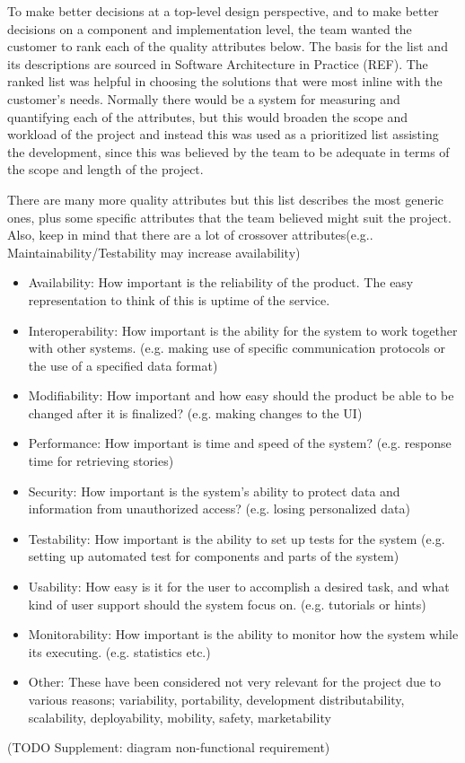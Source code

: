 To make better decisions at a top-level design perspective, and to make better decisions on a component and implementation level, the team wanted the customer to rank each of the quality attributes below. The basis for the list and its descriptions are sourced in Software Architecture in Practice (REF). The ranked list was helpful in choosing the solutions that were most inline with the customer’s needs. Normally there would be a system for measuring and quantifying each of the attributes, but this would broaden the scope and workload of the project and instead this was used as a prioritized list assisting the development, since this was believed by the team to be adequate in terms of the scope and length of the project.\newline

There are many more quality attributes but this list describes the most generic ones, plus some specific attributes that the team believed might suit the project. Also, keep in mind that there are a lot of crossover attributes(e.g.. Maintainability/Testability may increase availability)\newline
\begin{itemize}
\item Availability: How important is the reliability of the product. The easy representation to think of this is uptime of the service.
\item Interoperability: How important is the ability for the system to work together with other systems. (e.g. making use of specific communication protocols or the use of a specified data format)
\item Modifiability: How important and how easy should the product be able to be changed after it is finalized? (e.g. making changes to the UI)
\item Performance: How important is time and speed of the system? (e.g. response time for retrieving stories)
\item Security: How important is the system’s ability to protect data and information from unauthorized access? (e.g. losing personalized data)
\item Testability: How important is the ability to set up tests for the system (e.g. setting up automated test for components and parts of the system)
\item Usability: How easy is it for the user to accomplish a desired task, and what kind of user support should the system focus on. (e.g. tutorials or hints)
\item Monitorability: How important is the ability to monitor how the system while its executing. (e.g. statistics etc.)
\item Other: These have been considered not very relevant for the project due to various reasons; variability, portability, development distributability, scalability, deployability, mobility, safety, marketability
\end{itemize}

(TODO Supplement: diagram non-functional requirement)

\cleardoublepage

